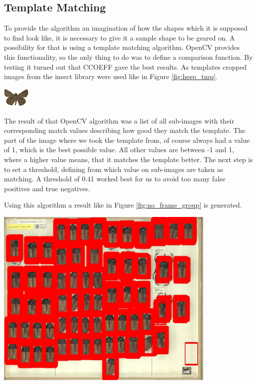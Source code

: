 \subsection{Template Matching}
To provide the algorithm an imagination of how the shapes which it is supposed to find look like, it is necessary to give it a sample shape to be geared on.
A possibility for that is using a template matching algorithm.
OpenCV provides this functionality, so the only thing to do was to define a comparison function.
By testing it turned out that CCOEFF gave the best results.
As templates cropped images from the insect library were used like in Figure \ref{fig:hesp_tmp}.
\begin{center}
	\includegraphics[width=0.1\textwidth]{images/hesp_template.jpg}
	\label{fig:hesp_tmp}
\end{center}
The result of that OpenCV algorithm was a list of all sub-images with their corresponding match values describing how good they match the template.
The part of the image where we took the template from, of course always had a value of 1, which is the best possible value.
All other values are between -1 and 1, where a higher value means, that it matches the template better.
The next step is to set a threshold, defining from which value on sub-images are taken as matching.
A threshold of 0.41 worked best for us to avoid too many false positives and true negatives.

Using this algorithm a result like in Figure \ref{fig:no_frame_group} is generated.
\begin{center}
	\includegraphics[width=0.8\textwidth]{images/no_frame_group.jpg}
	\label{fig:no_frame_group}
\end{center}

